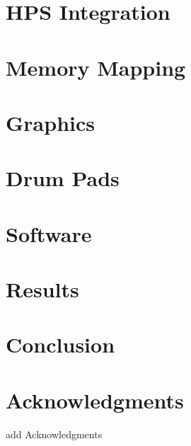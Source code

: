 \documentclass[10pt, letterpaper]{IEEEconf}
\begin{document}
  \section{HPS Integration}
  

  \section{Memory Mapping}
  

  \section{Graphics}
   

  \section{Drum Pads}
  

  \section{Software}
  

  \section{Results}
  

  \section{Conclusion}
  

  \section*{Acknowledgments}
  add Acknowledgments

  \cite{TestResource}

  \printbibliography
  
\end{document}
